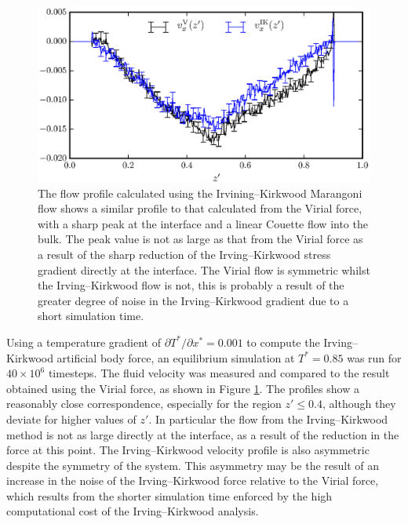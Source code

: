\begin{figure}[h]
\centering
\includegraphics[scale=0.8]{PisIKFlow}
\caption{The flow profile calculated using the Irvining--Kirkwood Marangoni flow shows a similar profile to that calculated from the Virial force, with a sharp peak at the interface and a linear Couette flow into the bulk.
The peak value is not as large as that from the Virial force as a result of the sharp reduction of the Irving--Kirkwood stress gradient directly at the interface.
The Virial flow is symmetric whilst the Irving--Kirkwood flow is not, this is probably a result of the greater degree of noise in the Irving--Kirkwood gradient due to a short simulation time.}
\label{PisIKFlow}
\end{figure}
Using a temperature gradient of $\partial T^{*} / \partial x^{*} = 0.001$ to compute the Irving--Kirkwood artificial body force, an equilibrium simulation at $T^{*} = 0.85$ was run for $40 \times 10^{6}$ timesteps.
The fluid velocity was measured and compared to the result obtained using the Virial force, as shown in Figure \ref{PisIKFlow}.
The profiles show a reasonably close correspondence, especially for the region $z' \leq 0.4$, although they deviate for higher values of $z'$.
In particular the flow from the Irving--Kirkwood method is not as large directly at the interface, as a result of the reduction in the force at this point.
The Irving--Kirkwood velocity profile is also asymmetric despite the symmetry of the system.
This asymmetry may be the result of an increase in the noise of the Irving--Kirkwood force relative to the Virial force, which results from the shorter simulation time enforced by the high computational cost of the Irving--Kirkwood analysis.

\FloatBarrier
